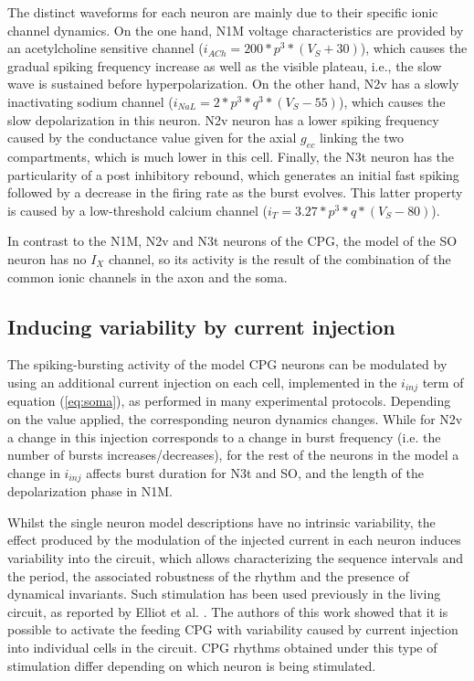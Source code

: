 The distinct waveforms for each neuron are mainly due to their specific ionic channel dynamics. On the one hand, N1M voltage characteristics are provided by an acetylcholine sensitive channel (\(i_{ACh} = 200 * p^3 * (V_S + 30)\)), which causes the gradual spiking frequency increase as well as the visible plateau, i.e., the slow wave is sustained before hyperpolarization. On the other hand, N2v has a slowly inactivating sodium channel (\(i_{NaL} = 2 * p^3 * q^3 * (V_S-55)\)), which causes the slow depolarization in this neuron. N2v neuron has a lower spiking frequency caused by the conductance value given for the axial $g_{ec}$ linking the two compartments, which is much lower in this cell. Finally, the N3t neuron has the particularity of a post inhibitory rebound, which generates an initial fast spiking followed by a decrease in the firing rate as the burst evolves. This latter property is caused by a low-threshold calcium channel (\( i_T = 3.27 * p^3 * q *(V_S-80)\)).

In contrast to the N1M, N2v and N3t neurons of the CPG, the model of the SO neuron has no \(I_X\) channel, so its activity is the result of the combination of the common ionic channels in the axon and the soma.

\subsection{Inducing variability by current injection}
\label{subsec:inj protocol}
The spiking-bursting activity of the model CPG neurons can be modulated by using an additional current injection on each cell, implemented in the \(i_{inj}\) term of equation (\ref{eq:soma}), as performed in many experimental protocols. Depending on the value %
applied,%
the corresponding neuron dynamics changes. While for N2v a change in this injection corresponds to a change in burst frequency (i.e. the number of bursts increases/decreases),
for the rest of the neurons in the model a change in \(i_{inj}\) affects burst duration for N3t and SO,  and the length of the depolarization phase in N1M.


Whilst the single neuron model descriptions have no intrinsic variability, the effect produced by the modulation of the injected current in each neuron induces variability into the circuit, which allows characterizing the sequence intervals and the period, the associated robustness of the rhythm and the presence of dynamical invariants. Such stimulation has been used previously in the living circuit, as reported by Elliot et al. \cite{Elliott1991}. The authors of this work showed that it is possible to activate the feeding CPG with variability caused by current injection into individual cells in the circuit. CPG rhythms obtained under this type of stimulation differ depending on which neuron is being stimulated. 


